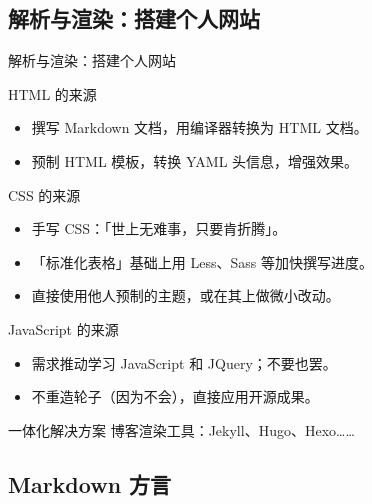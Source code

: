\documentclass{beamer}
\begin{document}
\subsection{解析与渲染：搭建个人网站}
\begin{frame}{解析与渲染：搭建个人网站}\scriptsize
\vspace{\baselineskip}

\pause
\begin{block}{HTML 的来源}
\begin{itemize}
    \item 撰写 Markdown 文档，用编译器转换为 HTML 文档。
    \item 预制 HTML 模板，转换 YAML 头信息，增强效果。
\end{itemize}
\end{block}

\pause
\begin{block}{CSS 的来源}
\begin{itemize}
    \item 手写 CSS：「世上无难事，只要肯折腾」。
    \item 「标准化表格」基础上用 Less、Sass 等加快撰写进度。
    \item 直接使用他人预制的主题，或在其上做微小改动。
\end{itemize}
\end{block}

\pause
\begin{block}{JavaScript 的来源}
\begin{itemize}
    \item 需求推动学习 JavaScript 和 JQuery；不要也罢。
    \item 不重造轮子（因为不会），直接应用开源成果。
\end{itemize}
\end{block}

\pause
\begin{alertblock}{一体化解决方案}
博客渲染工具：Jekyll、Hugo、Hexo……
\end{alertblock}

\end{frame}

\subsection{Markdown 方言}
\end{document}
